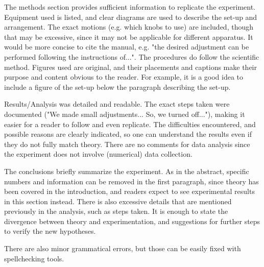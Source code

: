 \documentclass[12pt]{article}
\begin{document}
The methods section provides sufficient information to replicate the experiment. Equipment used is listed, and clear diagrams are used to describe the set-up and arrangement. The exact motions (e.g. which knobs to use) are included, though that may be excessive, since it may not be applicable for different apparatus. It would be more concise to cite the manual, e.g. "the desired adjustment can be performed following the instructions of...". The procedures do follow the scientific method. Figures used are original, and their placements and captions make their purpose and content obvious to the reader. For example, it is a good idea to include a figure of the set-up below the paragraph describing the set-up.

Results/Analysis was detailed and readable. The exact steps taken were documented ("We made small adjustments... So, we turned off..."), making it easier for a reader to follow and even replicate. The difficulties encountered, and possible reasons are clearly indicated, so one can understand the results even if they do not fully match theory. There are no comments for data analysis since the experiment does not involve (numerical) data collection.

The conclusions briefly summarize the experiment. As in the abstract, specific numbers and information can be removed in the first paragraph, since theory has been covered in the introduction, and readers expect to see experimental results in this section instead. There is also excessive details that are mentioned previously in the analysis, such as steps taken. It is enough to state the divergence between theory and experimentation, and suggestions for further steps to verify the new hypotheses.

There are also minor grammatical errors, but those can be easily fixed with spellchecking tools.
\end{document}
